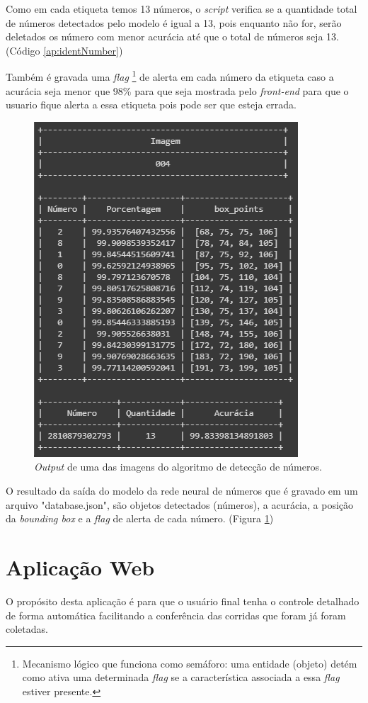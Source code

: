 Como em cada etiqueta temos 13 números, o \textit{script} verifica se a quantidade total de números detectados pelo modelo é igual a 13, pois enquanto não for, serão deletados os número com menor acurácia até que o total de números seja 13. (Código \ref{ap:identNumber})

Também é gravada uma \textit{flag} \footnote{Mecanismo lógico que funciona como semáforo: uma entidade (objeto) detém como ativa uma determinada \textit{flag} se a característica associada a essa \textit{flag} estiver presente.} de alerta em cada número da etiqueta caso a acurácia seja menor que 98\% para que seja mostrada pelo \textit{front-end} para que o usuario fique alerta a essa etiqueta pois pode ser que esteja errada.

\begin{figure}[H]
	\centering
	\includegraphics[width=0.53\linewidth]{figuras/MachineLearning/imageTag.png}
	\caption{\textit{Output} de uma das imagens do algoritmo de detecção de números.}
	\label{fig:imageTag}
\end{figure}

O resultado da saída do modelo da rede neural de números que é gravado em um arquivo "database.json", são objetos detectados (números), a acurácia, a posição da \textit{bounding box} e a \textit{flag} de alerta de cada número. (Figura \ref{fig:imageTag})

\section{Aplicação Web}

O propósito desta aplicação é para que o usuário final tenha o controle detalhado de forma automática facilitando a conferência das corridas que foram já foram coletadas.

